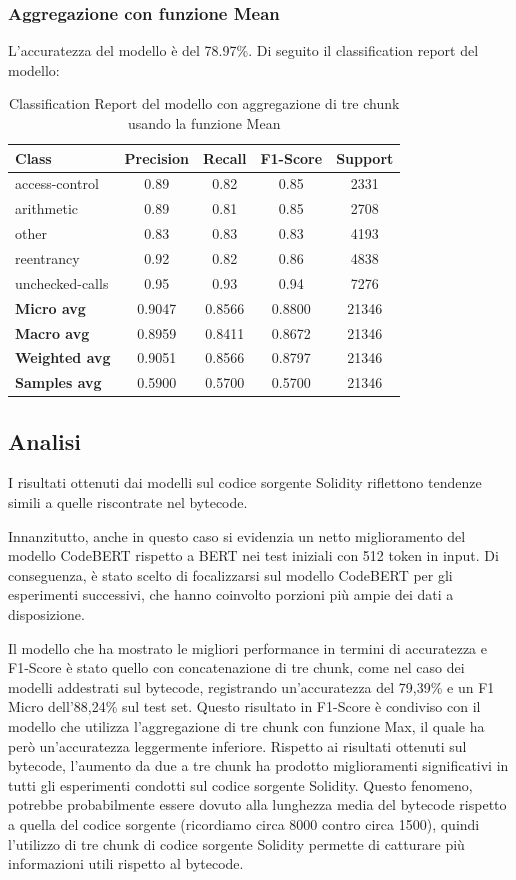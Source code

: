 \documentclass[../../Thesis.tex]{subfiles}
\begin{document}
\subsubsection{Aggregazione con funzione Mean}
L'accuratezza del modello è del 78.97\%. Di seguito il classification report del modello:

\begin{table}[H]
    \centering
    \small
    \begin{tabular}{lcccc}
    \hline
    \textbf{Class} & \textbf{Precision} & \textbf{Recall} & \textbf{F1-Score} & \textbf{Support} \\
    \hline
    access-control & 0.89 & 0.82 & 0.85 & 2331 \\
    arithmetic & 0.89 & 0.81 & 0.85 & 2708 \\
    other & 0.83 & 0.83 & 0.83 & 4193 \\
    reentrancy & 0.92 & 0.82 & 0.86 & 4838 \\
    unchecked-calls & 0.95 & 0.93 & 0.94 & 7276 \\
    \hline
    \textbf{Micro avg} & 0.9047 & 0.8566 & 0.8800 & 21346 \\
    \textbf{Macro avg} & 0.8959 & 0.8411 & 0.8672 & 21346 \\
    \textbf{Weighted avg} & 0.9051 & 0.8566 & 0.8797 & 21346 \\
    \textbf{Samples avg} & 0.5900 & 0.5700 & 0.5700 & 21346 \\
    \hline
    \end{tabular}
    \caption{Classification Report del modello con aggregazione di tre chunk usando la funzione Mean}
    \end{table}
\subsection{Analisi}
I risultati ottenuti dai modelli  sul codice sorgente Solidity riflettono tendenze simili a quelle riscontrate nel bytecode.

Innanzitutto, anche in questo caso si evidenzia un netto miglioramento del modello CodeBERT rispetto a BERT nei test iniziali con 512 token in input. Di conseguenza, è stato scelto di focalizzarsi sul modello CodeBERT per gli esperimenti successivi, che hanno coinvolto porzioni più ampie dei dati a disposizione.

Il modello che ha mostrato le migliori performance in termini di accuratezza e F1-Score è stato quello con concatenazione di tre chunk, come nel caso dei modelli addestrati sul bytecode, registrando un'accuratezza del 79,39\% e un F1 Micro dell'88,24\% sul test set. Questo risultato in F1-Score è condiviso con il modello che utilizza l'aggregazione di tre chunk con funzione Max, il quale ha però un'accuratezza leggermente inferiore. Rispetto ai risultati ottenuti sul bytecode, l'aumento da due a tre chunk ha prodotto miglioramenti significativi in tutti gli esperimenti condotti sul codice sorgente Solidity. Questo fenomeno, potrebbe probabilmente essere dovuto alla lunghezza media del bytecode rispetto a quella del codice sorgente (ricordiamo circa 8000 contro circa 1500), quindi l'utilizzo di tre chunk di codice sorgente Solidity permette di catturare più informazioni utili rispetto al bytecode.
\end{document}
